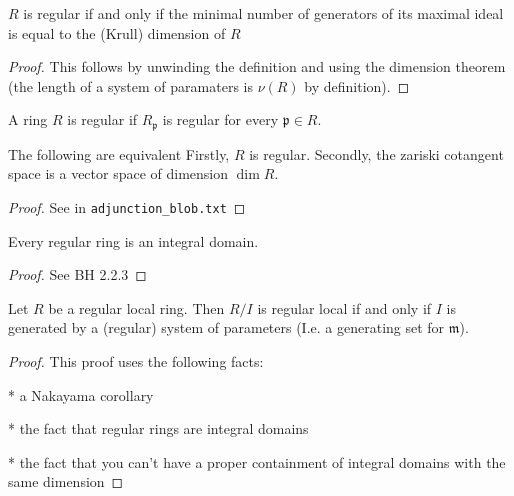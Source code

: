 \begin{lemma}
    \label{lem:reg_maximal_dim_generators}
    \(R\) is regular if and only if 
    the minimal number of generators of its maximal
    ideal is equal to the (Krull) dimension of \(R\)
\end{lemma}

\begin{proof}
    This follows by unwinding the definition 
    and using the dimension theorem 
    (the length of a system of paramaters is \(\nu(R)\)
    by definition).
\end{proof}

\begin{definition}
  \label{def:reg_ring}
  A ring $R$ is regular if 
  $R_{\mathfrak{p}}$ is regular
  for every $\mathfrak{p} \in R$.
\end{definition}

\begin{proposition}
  \label{prop:reg_def_equiv}
  The following are equivalent
  Firstly, $R$ is regular.
  Secondly, the zariski cotangent space
  is a vector space of dimension $\dim R$.
\end{proposition}

\begin{proof}
  See in \verb|adjunction_blob.txt|
\end{proof}

\begin{lemma}
  \label{lem:reg_int_dom}
  Every regular ring is an integral domain.
\end{lemma}

\begin{proof}

  See BH 2.2.3

\end{proof}

\begin{proposition}[BH 2.2.4]
  \label{prop:reg_quot_sys_param}
  Let $R$ be a regular local ring. 
  Then $R / I$ is regular local if and only if 
  $I$ is generated by a (regular) system of parameters
  (I.e. a generating set for $\mathfrak{m}$).
\end{proposition}

\begin{proof}
  This proof uses the following facts:

  * a Nakayama corollary
  
  * the fact that regular rings are integral domains

  * the fact that you can't have a proper containment
    of integral domains with the same dimension
\end{proof}

